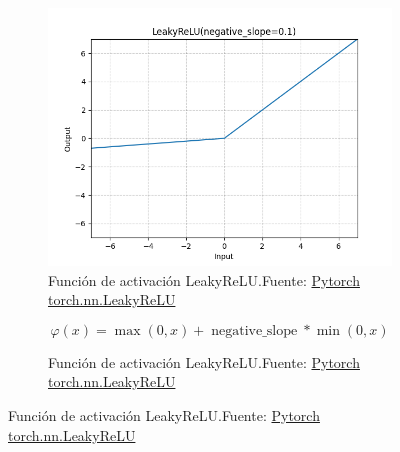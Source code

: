 \begin{figure}[H]
    \medskip %
    \begin{subfigure}{.475\linewidth}
        \centering
        \includegraphics[width=0.75\linewidth]{figures/equations/LeakyReLU.png}
        \caption{Función de activación LeakyReLU.\newline{}Fuente: \href{https://pytorch.org/docs/stable/generated/torch.nn.LeakyReLU.html}{Pytorch torch.nn.LeakyReLU}}
        \label{subfig:torch.nn.LeakyReLU}
    \end{subfigure}\hfill
    \begin{subfigure}{.475\linewidth}
        \centering
        \begin{small}
            \begin{equation*}
                \varphi(x) = \operatorname*{max}\left(0,x\right) + \operatorname*{negative\_slope} * \operatorname*{min}\left(0,x\right)
            \end{equation*}
        \end{small}
        \caption{Función de activación LeakyReLU.\newline{}Fuente: \href{https://pytorch.org/docs/stable/generated/torch.nn.LeakyReLU.html}{Pytorch torch.nn.LeakyReLU}}
        \label{subfig:eq-torch.nn.LeakyReLU}
    \end{subfigure}


\end{figure}
